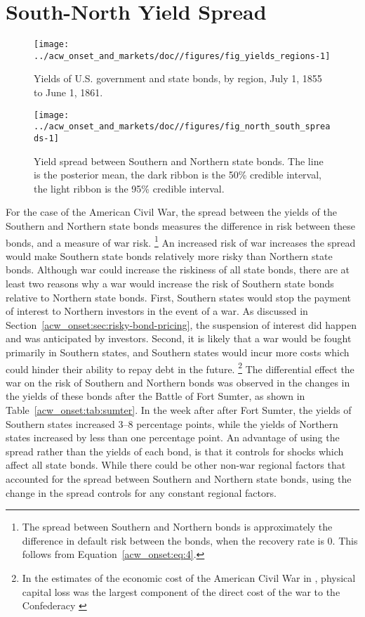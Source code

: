 \section{South-North Yield Spread}
\label{acw_onset:sec:south-north-yield}


\begin{figure}
  \centering
  \texttt{[image: ../acw\_onset\_and\_markets/doc//figures/fig\_yields\_regions-1]}
\caption{Yields of U.S. government and state bonds, by region, July  1, 1855 to June  1, 1861.}
\label{acw_onset:fig:yields_regions}
\end{figure}

\begin{figure}
  \centering
  \texttt{[image: ../acw\_onset\_and\_markets/doc//figures/fig\_north\_south\_spreads-1]}
\caption[Yield spread between Southern and Northern state bonds]{
  Yield spread between Southern and Northern state bonds.
  The line is the posterior mean, the dark ribbon is the 50\% credible interval, the light ribbon is the 95\% credible interval.
}
\label{acw_onset:fig:north_south_spreads}
\end{figure}

For the case of the American Civil War, the spread between the yields of the Southern and Northern state bonds measures the difference in risk between these bonds, and a measure of war risk.%
\footnote{
  The spread between Southern and Northern bonds is approximately the difference in default risk between the bonds, when the recovery rate is 0.
  This follows from Equation~\eqref{acw_onset:eq:4}.
}
An increased risk of war increases the spread would make Southern state bonds relatively more risky than Northern state bonds.
Although war could increase the riskiness of all state bonds, there are at least two reasons why a war would increase the risk of Southern state bonds relative to Northern state bonds.
First, Southern states would stop the payment of interest to Northern investors in the event of a war.
As discussed in Section~\ref{acw_onset:sec:risky-bond-pricing}, the suspension of interest did happen and was anticipated by investors.
Second, it is likely that a war would be fought primarily in Southern states, and Southern states would incur more costs which could hinder their ability to repay debt in the future.%
\footnote{In the estimates of the economic cost of the American Civil War in \textcite{GoldinLewis1975}, physical capital loss was the largest component of the direct cost of the war to the Confederacy \parencite[308]{GoldinLewis1975}}
The differential effect the war on the risk of Southern and Northern bonds was observed in the changes in the yields of these bonds after the Battle of Fort Sumter, as shown in Table~\ref{acw_onset:tab:sumter}.
In the week after after Fort Sumter, the yields of Southern states increased 3--8 percentage points, while the yields of Northern states increased by less than one percentage point.
An advantage of using the spread rather than the yields of each bond, is that it controls for shocks which affect all state bonds.
While there could be other non-war regional factors that accounted for the spread between Southern and Northern state bonds, using the change in the spread controls for any constant regional factors.

